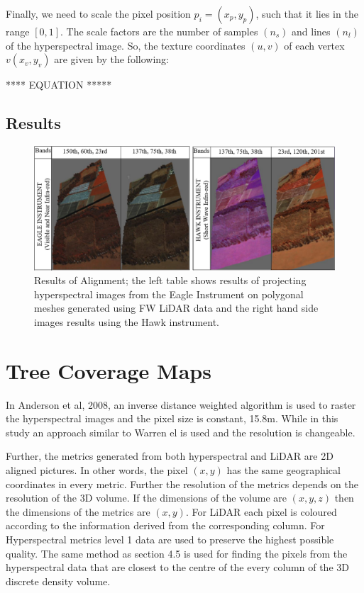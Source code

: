 \documentclass{subfiles}
\begin{document}
	\par Finally, we need to scale the pixel position $p_i = (x_p, y_p )$, such that it lies in the range $[0,1]$. The scale factors are the number of samples $(n_s)$ and lines $(n_l)$ of the hyperspectral image. So, the texture coordinates $(u, v)$ of each vertex $v(x_v , y_v)$ are given by the following:
		
		
	**** EQUATION *****
	
	\subsection {Results}
		
		  \begin{figure} [h!]
		  	\centering
		  	\includegraphics[width=\textwidth]{img/AlignmentEagle_Hawk}
		  	\caption[Results of Alignement]{Results of Alignment; the left table shows results of projecting hyperspectral images from the Eagle Instrument on polygonal meshes generated using FW LiDAR data and the right hand side images results using the Hawk instrument.}
		  	\label{fig:AlignementResults}
		  \end{figure}
		
		
\section{Tree Coverage Maps}

\par In Anderson et al, 2008, \cite{Anderson2008} an inverse distance weighted algorithm is used to raster the hyperspectral images and the pixel size is constant, 15.8m. While in this study an approach similar to Warren el \cite{Warren2014} is used and the resolution is changeable.

\par Further, the metrics generated from both hyperspectral and LiDAR are 2D aligned pictures. In other words, the pixel $(x, y)$ has the same geographical coordinates in every metric. Further the resolution of the metrics depends on the resolution of the 3D volume. If the dimensions of the volume are $(x, y, z)$ then the dimensions of the metrics are $(x, y)$. For LiDAR each pixel is coloured according to the information derived from the corresponding column. For Hyperspectral metrics level 1 data are used to preserve the highest possible quality. The same method as section 4.5 is used for finding the pixels from the hyperspectral data that are closest to the centre of the every column of the 3D discrete density volume.
\end{document}
